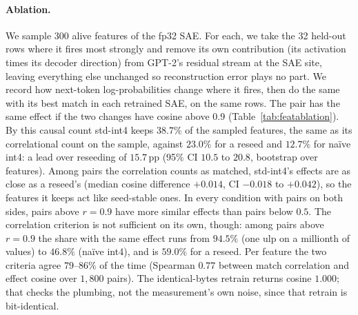 \documentclass{article}
\begin{document}
\paragraph{Ablation.} We sample 300 alive features of the fp32 SAE. For
each, we take the 32 held-out rows where it fires most strongly and
remove its own contribution (its activation times its decoder
direction) from GPT-2's residual stream at the SAE site, leaving
everything else unchanged so reconstruction error plays no part. We
record how next-token log-probabilities change where it fires, then do
the same with its best match in each retrained SAE, on the same rows.
The pair has the same effect if the two changes have cosine above $0.9$
(Table~\ref{tab:featablation}). By this causal count std-int4 keeps
$38.7\%$ of the sampled features, the same as its correlational count on
the sample, against $23.0\%$ for a reseed and $12.7\%$ for na\"ive
int4: a lead over reseeding of $15.7$\,pp (95\% CI $10.5$ to $20.8$,
bootstrap over features). Among pairs the correlation counts as matched,
std-int4's effects are as close as a reseed's (median cosine difference
$+0.014$, CI $-0.018$ to $+0.042$), so the features it keeps act like
seed-stable ones. In every condition with pairs on both sides, pairs
above $r = 0.9$ have more similar effects than pairs below $0.5$. The correlation criterion is not
sufficient on its own, though: among pairs above $r = 0.9$ the share
with the same effect runs from $94.5\%$ (one ulp on a millionth of
values) to $46.8\%$ (na\"ive int4), and is $59.0\%$ for a reseed. Per
feature the two criteria agree $79$--$86\%$ of the time (Spearman
$0.77$ between match correlation and effect cosine over $1{,}800$
pairs). The identical-bytes retrain returns cosine $1.000$; that checks
the plumbing, not the measurement's own noise, since that retrain is
bit-identical.
\end{document}
